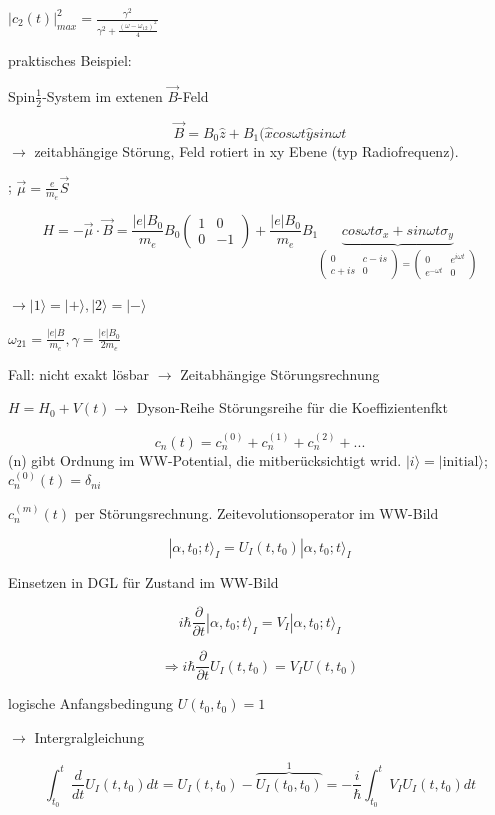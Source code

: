 \(|c_2(t)|^2_{max}=\frac{\gamma^2}{\gamma^2+\frac{(\omega-\omega_{12})^2}{4}}\)

praktisches Beispiel:

Spin\(\frac{1}{2}\)-System im extenen \(\vec B\)-Feld

\[ \vec B = B_0\hat z + B_1(\hat x cos\omega t \hat y sin\omega t\]
\(\rightarrow\) zeitabhängige Störung, Feld rotiert in xy Ebene (typ Radiofrequenz).

; \(\vec \mu = \frac{e}{m_e}\vec S\)

\[H=-\vec \mu\cdot\vec B = \frac{|e|B_0}{m_e}B_0\begin{pmatrix} 1&0\\0&-1 \end{pmatrix} +\frac{|e|B_0}{m_e}B_1\underbrace{cos\omega t \sigma_x+ sin\omega t \sigma_y}_{\begin{pmatrix}0&c-is\\c+is&0\end{pmatrix}=\begin{pmatrix}0&e^{i\omega t}\\e^{-\omega t}&0\end{pmatrix}}\]

\(\rightarrow |1\rangle = |+\rangle,|2\rangle=|-\rangle\)

\(\omega_{21} = \frac{|e|B}{m_e},\gamma = \frac{|e|B_0}{2m_e}\)

Fall: nicht exakt lösbar \(\rightarrow\) Zeitabhängige Störungsrechnung

\(H= H_0+V(t)\rightarrow\) Dyson-Reihe Störungsreihe für die Koeffizientenfkt

\[ c_n(t) = c_n^{(0)} +c_n^{(1)} +c_n^{(2)} + ... \]
(n) gibt Ordnung im WW-Potential, die mitberücksichtigt wrid. \(|i\rangle = |\text{initial}\rangle\); \(c_n^{(0)}(t) = \delta_{ni}\)

\(c_n^{(m)}(t)\) per Störungsrechnung. Zeitevolutionsoperator im WW-Bild

\[ |\alpha,t_0;t\rangle_I = U_I(t,t_0)|\alpha,t_0;t\rangle_I\]

Einsetzen in DGL für Zustand im WW-Bild

\[ i\hbar \frac{\partial}{\partial t}|\alpha,t_0;t\rangle_I  = V_I|\alpha,t_0;t\rangle_I \]

\[\Rightarrow i\hbar  \frac{\partial}{\partial t}U_I(t,t_0) = V_IU(t,t_0)\]

logische Anfangsbedingung \(U(t_0,t_0)=1\)

\(\rightarrow\) Intergralgleichung

\[ \int_{t_0}^{t}\frac{d}{dt} U_I(t,t_0) dt = U_I(t,t_0) -\overbrace{U_I(t_0,t_0) }^{1} = -\frac{i}{\hbar}\int_{t_0}^{t}V_IU_I(t,t_0)dt\]

